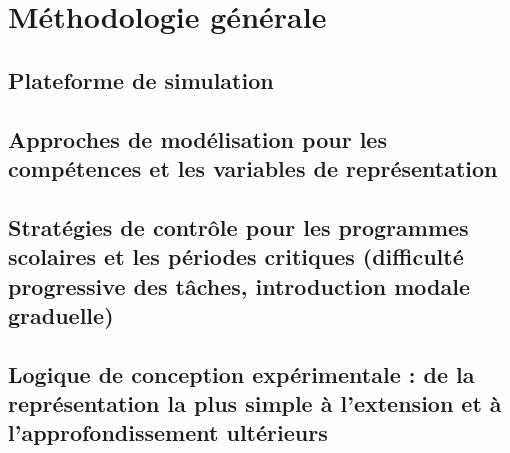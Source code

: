 \chapter{Méthodologie générale}

\section{Plateforme de simulation}

\section{Approches de modélisation pour les compétences et les variables de représentation}

\section{Stratégies de contrôle pour les programmes scolaires et les périodes critiques (difficulté progressive des tâches, introduction modale graduelle)}

\section{Logique de conception expérimentale : de la représentation la plus simple à l'extension et à l'approfondissement ultérieurs}

